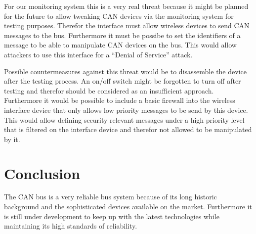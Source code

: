 For our monitoring system this is a very real threat because it might be planned
for the future to allow tweaking CAN devices via the monitoring system for
testing purposes. Therefor the interface must allow wireless devices to send CAN
messages to the bus. Furthermore it must be possibe to set the identifiers
of a message to be able to manipulate CAN devices on the bus. This would allow
attackers to use this interface for a ``Denial of Service'' attack.

Possible countermeasures against this threat would be to disassemble the device
after the testing process. An on/off switch might be forgotten to turn off after
testing and therefor should be considered as an insufficient approach.
Furthermore it would be possible to include a basic firewall into the wireless interface device
that only allows low priority messages to be send by this device. This would
allow defining security relevant messages under a high priority level that is
filtered on the interface device and therefor not allowed to be manipulated by
it.

\section{Conclusion}
The CAN bus is a very reliable bus system because of its long historic
background and the sophisticated devices available on the market. Furthermore it
is still under development to keep up with the latest technologies while
maintaining its high standards of reliability.

